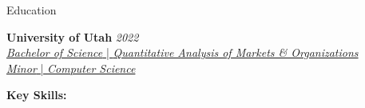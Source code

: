 \documentclass{resume/resume}
\begin{document}
\begin{rSection}{Education}

{\bf University of Utah} \hfill {\em 2022}
\vspace{2pt}
  \\ \href{https://eccles.utah.edu/programs/undergraduate/academics/majors/qamo/}{{\em Bachelor of Science} | {\em Quantitative Analysis of Markets \& Organizations}
  }
  \\ \href{https://github.com/search?o=desc&q=user\%3ASpelkington&s=updated&type=Repositories}{{\em Minor} | {\em Computer Science}}

%
%
%
%
%
%
%   
%
%
%
%

%
%
{\bf Key Skills:}
\vspace{-1.83em}


\end{rSection}
\end{document}
